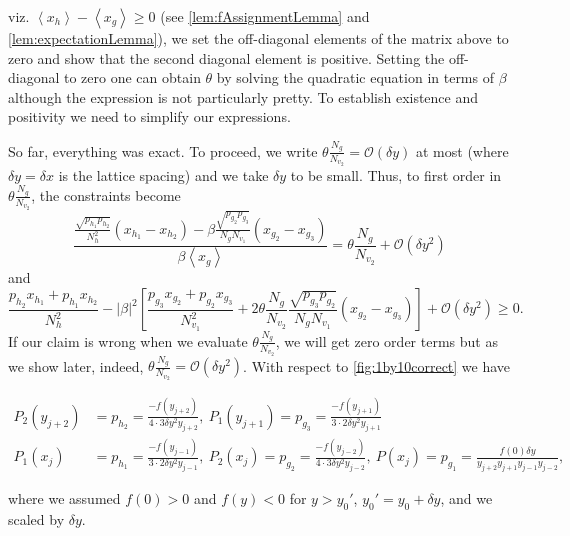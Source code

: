 \documentclass{theoretics}
\begin{document}
viz. $\left\langle x_{h}\right\rangle -\left\langle x_{g}\right\rangle \ge0$ (see \cref{lem:fAssignmentLemma} and \cref{lem:expectationLemma}), we set the off-diagonal elements of the matrix above to zero and show
that the second diagonal element
is positive. Setting the off-diagonal to zero one can obtain $\theta$ by solving
the quadratic equation in terms of $\beta$ although the expression is not
particularly pretty. To establish existence and positivity we need
to simplify our expressions.

So far, everything was exact. To proceed, we write  $\theta\frac{N_{g}}{N_{v_{2}}}=\mathcal{O}(\delta y)$
at most (where $\delta y=\delta x$ is the lattice spacing) and we take
$\delta y$ to be small. Thus, to first order in $\theta\frac{N_{g}}{N_{v_{2}}}$, the constraints become
\begin{displaymath}
  \frac{\frac{\sqrt{p_{h_{1}}p_{h_{2}}}}{N_{h}^{2}}(x_{h_{1}}-x_{h_{2}})-\beta\frac{\sqrt{p_{g_{2}}p_{g_{3}}}}{N_{g}N_{v_{1}}}(x_{g_{2}}-x_{g_{3}})}{\beta\left\langle x_{g}\right\rangle }=\theta\frac{N_{g}}{N_{v_{2}}}+\mathcal{O}(\delta y^{2})
\end{displaymath}
and
\begin{displaymath}
  \frac{p_{h_{2}}x_{h_{1}}+p_{h_{1}}x_{h_{2}}}{N_{h}^{2}}-\left|\beta\right|^{2}\left[\frac{p_{g_{3}}x_{g_{2}}+p_{g_{2}}x_{g_{3}}}{N_{v_{1}}^{2}}+2\theta\frac{N_{g}}{N_{v_{2}}}\frac{\sqrt{p_{g_{3}}p_{g_{2}}}}{N_{g}N_{v_{1}}}(x_{g_{2}}-x_{g_{3}})\right]+\mathcal{O}(\delta y^{2})\ge0.
\end{displaymath}
If our claim is wrong when we evaluate $\theta\frac{N_{g}}{N_{v_{2}}}$,
we will get zero order terms but as we show later, indeed,
$\theta\frac{N_{g}}{N_{v_{2}}}=\mathcal{O}(\delta y^{2})$. With respect to  \cref{fig:1by10correct} we have
\begin{footnotesize}
  \begin{align*}
    P_{2}(y_{j+2}) & =p_{h_{2}}=\frac{-f(y_{j+2})}{4\cdot 3\delta y^{2}y_{j+2}},\
    P_{1}(y_{j+1}) =p_{g_{3}}=\frac{-f(y_{j+1})}{3\cdot 2\delta y^{2}y_{j+1}}      \\
    P_{1}(x_{j})   & =p_{h_{1}}=\frac{-f(y_{j-1})}{3 \cdot 2\delta y^{2}y_{j-1}},\
    P_{2}(x_{j})  =p_{g_{2}}=\frac{-f(y_{j-2})}{4 \cdot 3\delta y^{2}y_{j-2}},\
    P(x_{j})  =p_{g_{1}}=\frac{f(0)\delta y}{y_{j+2}y_{j+1}y_{j-1}y_{j-2}},
  \end{align*}
\end{footnotesize}
where we assumed $f(0)>0$ and $f(y)<0$ for $y>y_{0}'$, $y_{0}'=y_{0}+\delta y$, and we
scaled by $\delta y$.
\end{document}
